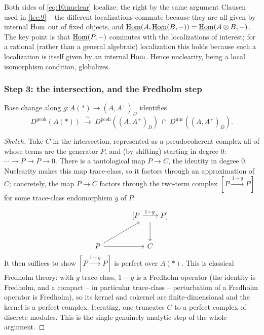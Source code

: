 \begin{remark}
\label{rmk:10:nuclear-globalize}
Both sides of \eqref{eq:10:nuclear} localize: the right by the same argument
Clausen used in \cref{lec:9} -- the different localizations commute because they
are all given by internal $\operatorname{Hom}$ out of fixed objects, and
$\underline{\operatorname{Hom}}(A,\underline{\operatorname{Hom}}(B,-))=\underline{\operatorname{Hom}}(A\otimes B,-)$.
The key point is that $\underline{\operatorname{Hom}}(P,-)$ commutes with the localizations of
interest; for a rational (rather than a general algebraic) localization this holds
because such a localization is itself given by an internal $\operatorname{Hom}$. Hence
nuclearity, being a local isomorphism condition, globalizes.
\end{remark}

\subsubsection*{Step 3: the intersection, and the Fredholm step}

\begin{proposition}[Discrete pseudocoherent $=$ solid pseudocoherent $\cap$ nuclear]
\label{prop:10:intersection}
Base change along $g\colon A(\ast)\to(A,A^{+})_{D}$ identifies
\begin{equation*}
D^{\mathrm{pcoh}}(A(\ast))\ \xrightarrow{\ \sim\ }\
D^{\mathrm{pcoh}}((A,A^{+})_{D})\ \cap\ D^{\mathrm{nuc}}((A,A^{+})_{D}).
\end{equation*}
\end{proposition}

\begin{proof}[Sketch]
Take $C$ in the intersection, represented as a pseudocoherent complex all of whose
terms are the generator $P$, and (by shifting) starting in degree $0$:
$\cdots\to P\to P\to0$. There is a tautological map $P\to C$, the identity in
degree $0$. Nuclearity makes this map trace-class, so it factors through an
approximation of $C$; concretely, the map $P\to C$ factors through the two-term
complex $[P\xrightarrow{\,1-g\,}P]$ for some trace-class endomorphism $g$ of $P$:
\[
\begin{tikzcd}[row sep=large, column sep=large]
& {[P\xrightarrow{\,1-g\,}P]} \arrow[d] \\
P \arrow[ur] \arrow[r] & C
\end{tikzcd}
\]
It then suffices to show $[P\xrightarrow{1-g}P]$ is perfect over $A(\ast)$. This is
classical Fredholm theory: with $g$ trace-class, $1-g$ is a Fredholm operator
(the identity is Fredholm, and a compact -- in particular trace-class --
perturbation of a Fredholm operator is Fredholm), so its kernel and cokernel are
finite-dimensional and the kernel is a perfect complex. Iterating, one truncates
$C$ to a perfect complex of discrete modules. This is the single genuinely
analytic step of the whole argument.
\end{proof}

